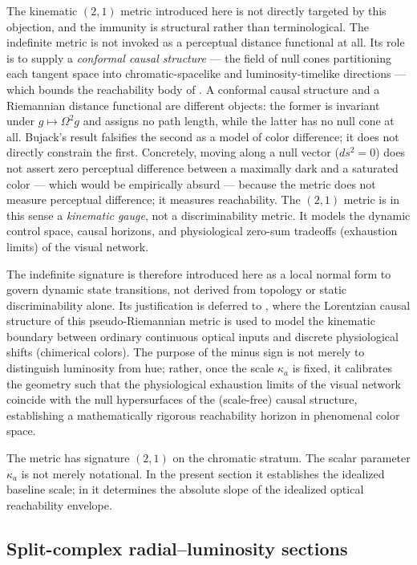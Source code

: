 \documentclass[preprint,12pt,authoryear]{elsarticle}
\theoremstyle{plain}
\theoremstyle{definition}
\theoremstyle{remark}
\begin{document}
The kinematic $(2,1)$ metric introduced here is not directly targeted by this objection, and the immunity is structural rather than terminological. The indefinite metric is not invoked as a perceptual distance functional at all. Its role is to supply a \emph{conformal causal structure} --- the field of null cones partitioning each tangent space into chromatic-spacelike and luminosity-timelike directions --- which bounds the reachability body of . A conformal causal structure and a Riemannian distance functional are different objects: the former is invariant under $g\mapsto\Omega^2 g$ and assigns no path length, while the latter has no null cone at all. Bujack's result falsifies the second as a model of color difference; it does not directly constrain the first. Concretely, moving along a null vector ($ds^2=0$) does not assert zero perceptual difference between a maximally dark and a saturated color --- which would be empirically absurd --- because the metric does not measure perceptual difference; it measures reachability. The $(2,1)$ metric is in this sense a \emph{kinematic gauge}, not a discriminability metric. It models the dynamic control space, causal horizons, and physiological zero-sum tradeoffs (exhaustion limits) of the visual network.

The indefinite signature is therefore introduced here as a local normal form to govern dynamic state transitions, not derived from topology or static discriminability alone. Its justification is deferred to , where the Lorentzian causal structure of this pseudo-Riemannian metric is used to model the kinematic boundary between ordinary continuous optical inputs and discrete physiological shifts (chimerical colors). The purpose of the minus sign is not merely to distinguish luminosity from hue; rather, once the scale $\kappa_a$ is fixed, it calibrates the geometry such that the physiological exhaustion limits of the visual network coincide with the null hypersurfaces of the (scale-free) causal structure, establishing a mathematically rigorous reachability horizon in phenomenal color space.

The metric has signature $(2,1)$ on the chromatic stratum. The scalar parameter $\kappa_a$ is not merely notational. In the present section it establishes the idealized baseline scale; in  it determines the absolute slope of the idealized optical reachability envelope.

\subsection{Split-complex radial--luminosity sections}
\label{subsec:split-complex-sections}
\end{document}
